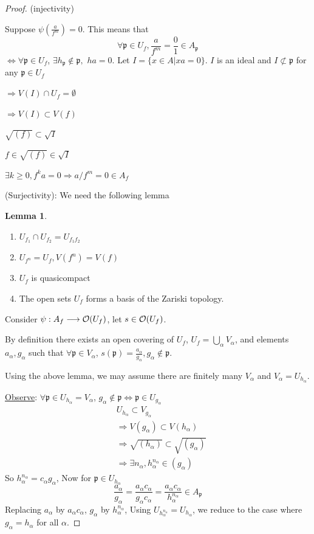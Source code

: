 \documentclass[11pt]{article}
\theoremstyle{definition}
\newtheorem{lemma}[thm]{Lemma}
\newcommand{\scp}{{\mathfrak p}}
\newcommand{\calo}{{\cal O}}
\newcommand{\notsubset}{\not \subset}
\newcommand{\Lrta}{\Longrightarrow}
\newcommand{\lrta}{\longrightarrow}
\newcommand{\Llrta}{\Longleftrightarrow}
\begin{document}
\begin{proof}
(injectivity)

Suppose $\psi\left(\frac{a}{f^m}\right)=0$. This means that 
$$
\forall \scp\in U_f, \frac{a}{f^m}=\frac{0}{1}\in A_\scp
$$
$\Llrta \forall \scp\in U_f$, $\exists h_\scp\notin \scp,$ $ha=0$. Let $I=\{x\in A|xa=0\}$. $I$ is an ideal and $I\notsubset \scp$ for any $\scp \in U_f$

$\Lrta V(I)\cap U_f=\emptyset$

$\Lrta V(I)\subset V(f)$

$\sqrt{(f)}\subset \sqrt{I}$

$f\in \sqrt{(f)}\in\sqrt{I}$

$\exists k\geq 0, f^ka=0\Lrta a/f^m=0\in A_f$

(Surjectivity): We need the following lemma
\begin{lemma}\ 
\begin{enumerate}[label=(\arabic*)]
\item $U_{f_1}\cap U_{f_2}=U_{f_1f_2}$
\item $U_{f^n}=U_{f}, V(f^n)=V(f)$
\item $U_f$ is quasicompact
\item The open sets $U_f$ forms a basis of the Zariski topology.
\end{enumerate}
\end{lemma}
Consider $\psi:A_f\lrta \calo(U_f)$, let $s\in \calo(U_f)$.

By definition there exists an open covering of $U_f$, $U_f=\bigcup_\alpha V_\alpha$, and elements $a_\alpha, g_\alpha$ such that $\forall \scp\in V_\alpha$, $s(\scp)=\frac{a_\alpha}{g_\alpha}, g_\alpha\notin \scp$.

Using the above lemma,  we may assume  there are finitely many $V_\alpha$ and $V_\alpha=U_{h_\alpha}$.

\underline{Observe}: $\forall \scp\in U_{h_\alpha}=V_\alpha$, $g_\alpha\notin\scp\Llrta \scp\in U_{g_\alpha}$
$$
\begin{aligned}
&U_{h_\alpha}\subset V_{g_\alpha}\\
& \Lrta V(g_\alpha)\subset V(h_\alpha)\\
&\Lrta \sqrt{(h_\alpha)}\subset \sqrt{(g_\alpha)}\\
&\Lrta \exists n_\alpha, h^{n_\alpha}_{\alpha}\in (g_{\alpha})
\end{aligned}
$$
So $h^{n_\alpha}_\alpha=c_\alpha g_\alpha$, Now for $\scp\in U_{h_\alpha}$
$$
\frac{a_\alpha}{g_\alpha}=\frac{a_\alpha c_\alpha }{g_\alpha c_\alpha}=\frac{a_\alpha c_\alpha}{h_\alpha^{n_\alpha}}\in A_\scp
$$
Replacing $a_\alpha$ by $a_\alpha c_\alpha$, $g_\alpha$ by $h^{n_\alpha}_{\alpha}$, Using $U_{h_\alpha^{n_\alpha}}=U_{h_\alpha}$, we reduce to the case where $g_\alpha=h_\alpha$ for all $\alpha$.


\end{proof}
\end{document}

